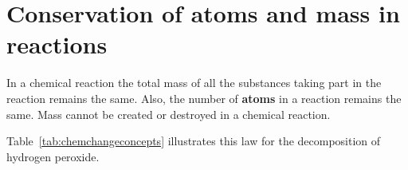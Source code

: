     \label{m38711*cid5}
            \section{Conservation of atoms and mass in reactions}
            \nopagebreak
      \label{m38711*id64489}In a chemical reaction the total mass of all the substances taking part in the reaction remains the same. Also, the number of \textbf{atoms} in a reaction remains the same. Mass cannot be created or destroyed in a chemical reaction.\par 
{}
Table~\ref{tab:chemchangeconcepts} illustrates this law for the decomposition of hydrogen peroxide.
